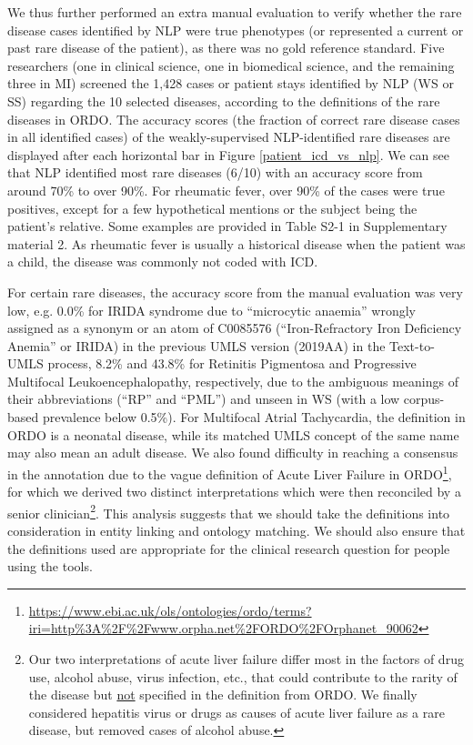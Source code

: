 \documentclass[twocolumn]{bmcart}
\begin{document}
We thus further performed an extra manual evaluation to verify whether the rare disease cases identified by NLP were true phenotypes (or represented a current or past rare disease of the patient), as there was no gold reference standard. Five researchers (one in clinical science, one in biomedical science, and the remaining three in MI) screened the 1,428 cases or patient stays identified by NLP (WS or SS) regarding the 10 selected diseases, according to the definitions of the rare diseases in ORDO. The accuracy scores (the fraction of correct rare disease cases in all identified cases) of the weakly-supervised NLP-identified rare diseases are displayed after each horizontal bar in Figure \ref{patient_icd_vs_nlp}. We can see that NLP identified most rare diseases (6/10) with an accuracy score from around 70\% to over 90\%. For rheumatic fever, over 90\% of the cases were true positives, except for a few hypothetical mentions or the subject being the patient's relative. Some examples are provided in Table S2-1 in Supplementary material 2. As rheumatic fever is usually a historical disease when the patient was a child, the disease was commonly not coded with ICD. 

For certain rare diseases, the accuracy score from the manual evaluation was very low, e.g. 0.0\% for IRIDA syndrome due to ``microcytic anaemia'' wrongly assigned as a synonym or an atom of C0085576 (``Iron-Refractory Iron Deficiency Anemia'' or IRIDA) in the previous UMLS version (2019AA) in the Text-to-UMLS process, 8.2\% and 43.8\% for Retinitis Pigmentosa and Progressive Multifocal Leukoencephalopathy, respectively, due to the ambiguous meanings of their abbreviations (``RP'' and ``PML'') and unseen in WS (with a low corpus-based prevalence below 0.5\%). For Multifocal Atrial Tachycardia, the definition in ORDO is a neonatal disease, while its matched UMLS concept of the same name may also mean an adult disease. We also found difficulty in reaching a consensus in the annotation due to the vague definition of Acute Liver Failure in ORDO\footnote{\url{https://www.ebi.ac.uk/ols/ontologies/ordo/terms?iri=http\%3A\%2F\%2Fwww.orpha.net\%2FORDO\%2FOrphanet_90062}}, for which we derived two distinct interpretations which were then reconciled by a senior clinician\footnote{Our two interpretations of acute liver failure differ most in the factors of drug use, alcohol abuse, virus infection, etc., that could contribute to the rarity of the disease but \underline{not} specified in the definition from ORDO. We finally considered hepatitis virus or drugs as causes of acute liver failure as a rare disease, but removed cases of alcohol abuse.}. This analysis suggests that we should take the definitions into consideration in entity linking and ontology matching. We should also ensure that the definitions used are appropriate for the clinical research question for people using the tools.
\end{document}
